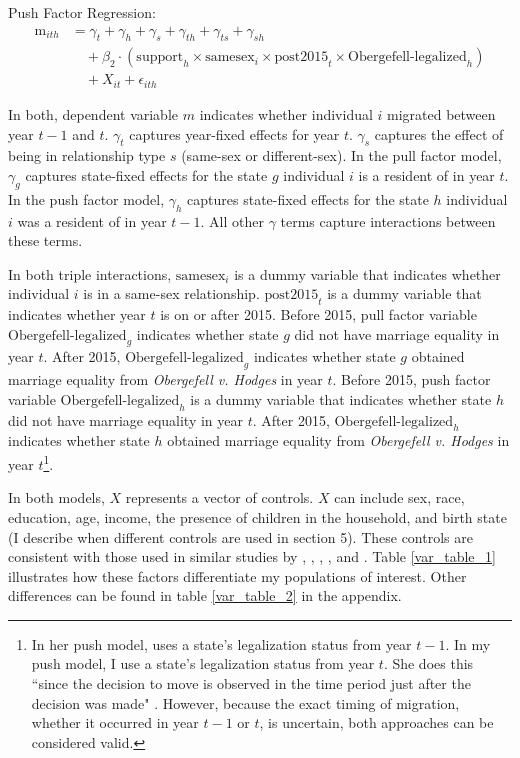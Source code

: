 \documentclass[12pt,letterpaper]{article}
\begin{document}
\hfill
\break
Push Factor Regression:
\begin{equation}
\begin{aligned}
\text{m}_{ith} &= \gamma_t + \gamma_h + \gamma_s + \gamma_{th} + \gamma_{ts} + \gamma_{sh} \\
&\quad + \beta_2 \cdot (\text{support}_h \times \text{samesex}_i \times \text{post2015}_t \times \text{Obergefell-legalized}_h) \\
&\quad + X_{it} + \epsilon_{ith}
\end{aligned}
\end{equation}

In both, dependent variable $m$ indicates whether individual $i$ migrated between year $t-1$ and $t$. $\gamma_t$ captures year-fixed effects for year $t$. $\gamma_s$ captures the effect of being in relationship type $s$ (same-sex or different-sex). In the pull factor model, $\gamma_g$ captures state-fixed effects for the state $g$ individual $i$ is a resident of in year $t$. In the push factor model, $\gamma_h$ captures state-fixed effects for the state $h$ individual $i$ was a resident of in year $t-1$. All other $\gamma$ terms capture interactions between these terms. 

In both triple interactions, $\text{samesex}_i$ is a dummy variable that indicates whether individual $i$ is in a same-sex relationship. $\text{post2015}_t$ is a dummy variable that indicates whether year $t$ is on or after 2015. Before 2015, pull factor variable $\text{Obergefell-legalized}_g$ indicates whether state $g$ did not have marriage equality in year $t$. After 2015, $\text{Obergefell-legalized}_g$ indicates whether state $g$ obtained marriage equality from \textit{Obergefell v. Hodges} in year $t$. Before 2015, push factor variable $\text{Obergefell-legalized}_h$ is a dummy variable that indicates whether state $h$ did not have marriage equality in year $t$. After 2015, $\text{Obergefell-legalized}_h$ indicates whether state $h$ obtained marriage equality from \textit{Obergefell v. Hodges} in year $t$\footnote{In her push model, \citet{12} uses a state's legalization status from year $t-1$. In my push model, I use a state's legalization status from year $t$. She does this ``since the decision to move is observed in the time
period just after the decision was made" \citep[p. 2959]{12}. However, because the exact timing of migration, whether it occurred in year $t-1$ or $t$, is uncertain, both approaches can be considered valid.}.

In both models, $X$ represents a vector of controls. $X$ can include sex, race, education, age, income, the presence of children in the household, and birth state (I describe when different controls are used in section 5). These controls are consistent with those used in similar studies by \citet{1}, \citet{3}, \citet{5}, \citet{7}, and \citet{12}. Table \ref{var_table_1} illustrates how these factors differentiate my populations of interest. Other differences can be found in table \ref{var_table_2} in the appendix.
\end{document}
